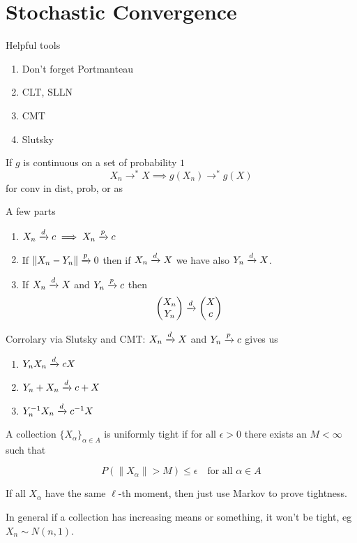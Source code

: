 \documentclass{article}
\begin{document}
\section{Stochastic Convergence}
Helpful tools
\begin{enumerate}
	\item Don't forget Portmanteau
	\item CLT, SLLN 
	\item CMT
	\item Slutsky
\end{enumerate} 
\begin{theorem}[CMT]
If $g$ is continuous on a set of probability $1$
$$X_n\to^* X \implies g(X_n) \to^* g(X)$$
for conv in dist, prob, or as
\end{theorem}
\begin{theorem}[Slutsky]
A few parts
\begin{enumerate}
	\item $X_n \xrightarrow{d} c \implies X_n \xrightarrow{p} c$
	\item If $\|X_n - Y_n\| \xrightarrow{p} 0$ then if $X_n \xrightarrow{d} X$ we have also $Y_n \xrightarrow{d} X$. 
	\item If $X_n \xrightarrow{d} X$ and $Y_n \xrightarrow{p} c$ then
	$$\begin{pmatrix}
		X_n\\Y_n 
	\end{pmatrix}\xrightarrow{d} \begin{pmatrix}
		X\\c 
	\end{pmatrix}$$
	\end{enumerate}
	Corrolary via Slutsky and CMT:
	$X_n\xrightarrow{d} X$ and $Y_n \xrightarrow{p} c$ gives us 
	\begin{enumerate}
	\item $Y_n X_n \xrightarrow{d} cX$
	\item $Y_n + X_n \xrightarrow{d} c+ X$
	\item $Y_n^{-1} X_n \xrightarrow{d} c^{-1} X$
	\end{enumerate}

\end{theorem}
\begin{definition}
A collection $\{X_\alpha\}_{\alpha \in A}$ is uniformly tight if for all $\epsilon>0$ there exists an $M<\infty$ such that 

$$P(\|X_\alpha\|>M) \leq \epsilon \quad \text{for all } \alpha \in A$$
\end{definition}
\begin{example}
If all $X_\alpha$ have the same $\ell$-th moment, then just use Markov to prove tightness. 
\end{example}
In general if a collection has increasing means or something, it won't be tight, eg $X_n \sim N(n,1)$. 
\end{document}
